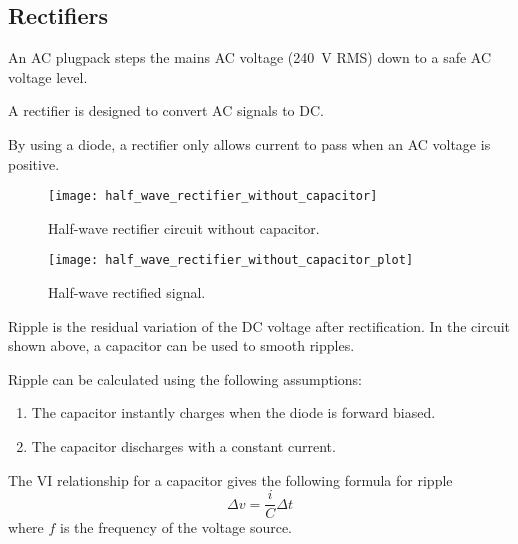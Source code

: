 \documentclass{article}
\begin{document}
\subsection{Rectifiers}
\begin{definition}[Plugpack]
    An AC plugpack steps the mains AC voltage (\SI{240}{\volt} RMS) down to a safe AC voltage level.
\end{definition}
\begin{definition}[Rectifier]
    A rectifier is designed to convert AC signals to DC.
\end{definition}
By using a diode, a rectifier only allows current to pass when an AC
voltage is positive.
\begin{figure}[H]
    \centering
    \texttt{[image: half\_wave\_rectifier\_without\_capacitor]}
    \caption{Half-wave rectifier circuit without capacitor.}
\end{figure}
\begin{figure}[H]
    \centering
    \texttt{[image: half\_wave\_rectifier\_without\_capacitor\_plot]}
    \caption{Half-wave rectified signal.}
\end{figure}
\begin{definition}[Ripple]
    Ripple is the residual variation of the DC voltage after rectification.
    In the circuit shown above, a capacitor can be used to smooth ripples.
    
    Ripple can be calculated using the following assumptions:
    \begin{enumerate}
        \item The capacitor instantly charges when the diode is forward biased.
        \item The capacitor discharges with a constant current.
    \end{enumerate}
    The VI relationship for a capacitor gives the following formula for ripple
    \begin{equation*}
        \Delta v = \frac{i}{C} \Delta t
    \end{equation*}
    where $f$ is the frequency of the voltage source.
\end{definition}
\end{document}
